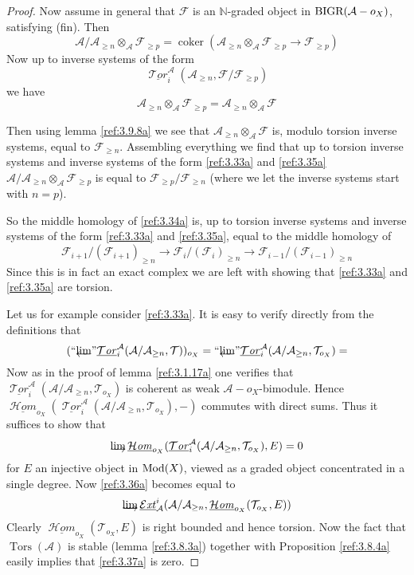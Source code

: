 \documentclass{amsproc}
\def \NN{{\mathbb N}}
\def\Ascr{{\mathcal A}}
\def\Escr{{\mathcal E}}
\def\Fscr{{\mathcal F}}
\def\Hscr{{\mathcal H}}
\def\Tscr{{\mathcal T}}
\def\HHom{\operatorname {\Hscr \mathit{om}}}
\def\HExt{\operatorname {\Escr \mathit{xt}}}
\def\HTor{\operatorname {\Tscr \mathit{or}}}
\def\Mod{\mathop{\text{Mod}}}
\def\BIGR{\mathop{\text{BIGR}}}
\def\Tors{\operatorname{Tors}}
\def\HHom{\operatorname {\Hscr \mathit{om}}}
\def\HExt{\operatorname {\Escr \mathit{xt}}}
\def\HTor{\operatorname {\Tscr \mathit{or}}}
\def\coker{\operatorname {coker}}
\def\Tors{\operatorname {Tors}}
\def\r{\rightarrow}
\let\oldtext\text
\def\text#1{\oldtext{\upshape #1}}
\let\invlim\projlim
\theoremstyle{definition}
\theoremstyle{remark}
\def\dirlim{\mathop{\vtop{\baselineskip -100pt\lineskip -1pt\lineskiplimit 0pt
\setbox0\hbox{\upshape lim}\copy0\hbox to \wd0{\rightarrowfill}}}\limits}
\def\invlim{\mathop{\vtop{\baselineskip -100pt\lineskip -1pt\lineskiplimit 0pt
\setbox0\hbox{\upshape lim}\copy0\hbox to \wd0{\leftarrowfill}}}\limits}
\numberwithin{equation}{section}
\numberwithin{table}{section}
\numberwithin{figure}{section}
\begin{document}
\begin{proof}
Now assume in general that $\Fscr$ is an $\NN$-graded object in $\BIGR(\Ascr-o_X)$,
satisfying (fin). 
 Then 
\[
\Ascr/\Ascr_{\ge n}\otimes_\Ascr \Fscr_{\ge p}=\coker (\Ascr_{\ge
  n}\otimes_\Ascr \Fscr_{\ge p}\r \Fscr_{\ge p})
\]
Now up to inverse systems of the form
\begin{equation}
\label{ref:3.35a}
\underline{\HTor}_i^\Ascr(\Ascr_{\ge n},\Fscr/\Fscr_{\ge p})
\end{equation}
we have
\[
\Ascr_{\ge n}\otimes_\Ascr \Fscr_{\ge p}=\Ascr_{\ge n}\otimes_\Ascr \Fscr
\]

Then using lemma \ref{ref:3.9.8a} we see that $ \Ascr_{\ge
  n}\otimes_\Ascr \Fscr $ is, modulo torsion inverse systems, equal to
$ \Fscr_{\ge n} $.  Assembling everything we find that up to torsion
inverse systems and inverse systems of the form \eqref{ref:3.33a} and
\eqref{ref:3.35a} $\Ascr/\Ascr_{\ge n}\otimes_\Ascr \Fscr_{\ge p}$
is equal to $\Fscr_{\ge p}/\Fscr_{\ge n}$ (where we let the inverse
systems start with $n=p$).




So the middle homology of \eqref{ref:3.34a} is, up to torsion inverse
systems and inverse systems of the form \eqref{ref:3.33a} and \eqref{ref:3.35a}, equal
to the middle homology of 
\[
\Fscr_{i+1}/(\Fscr_{i+1})_{\ge n}
\r
\Fscr_{i}/(\Fscr_{i})_{\ge n}
\r
\Fscr_{i-1}/(\Fscr_{i-1})_{\ge n}
\]
Since this is in fact an exact complex we are left with showing that
\eqref{ref:3.33a} and \eqref{ref:3.35a} are torsion.

Let us for example consider \eqref{ref:3.33a}. It is easy to verify
directly from the definitions that 
\[
(``{\invlim}{}"\underline{\HTor}^\Ascr_i(\Ascr/\Ascr_{\ge
  n},\Tscr))_{o_X}=
``{\invlim}{}"\underline{\HTor}^\Ascr_i(\Ascr/\Ascr_{\ge
  n},\Tscr_{o_X})=
\]
Now as in the proof of lemma \ref{ref:3.1.17a} one verifies that
$\underline{\HTor}^\Ascr_i(\Ascr/\Ascr_{\ge n},\Tscr_{o_X})$ is
coherent as weak $\Ascr-o_X$-bimodule. Hence
$\underline{\HHom}_{o_X}(\underline{\HTor}^\Ascr_i(\Ascr/\Ascr_{\ge
  n},\Tscr_{o_X}),-)$ commutes with direct sums.  Thus it suffices to
show that 
\begin{equation}
\label{ref:3.36a}
\dirlim\underline{\HHom}_{o_X}(\underline{\HTor}^\Ascr_i(\Ascr/\Ascr_{\ge
  n},\Tscr_{o_X}),E)=0
\end{equation}
for $E$ an injective object in $\Mod(X)$, viewed as a graded object
concentrated in a single degree.  Now \eqref{ref:3.36a} becomes equal to
\begin{equation}
\label{ref:3.37a}
\dirlim\underline{\HExt}^i_{\Ascr}(\Ascr/\Ascr_{\ge
  n},\underline{\HHom}_{o_X}(\Tscr_{o_X},E))
\end{equation}
Clearly $\underline{\HHom}_{o_X}(\Tscr_{o_X},E)$ is right bounded and
hence torsion. Now the fact that $\Tors(\Ascr)$ is stable (lemma
\ref{ref:3.8.3a}) together with Proposition \ref{ref:3.8.4a} easily
implies that \eqref{ref:3.37a} is zero.
\end{proof}
\end{document}
